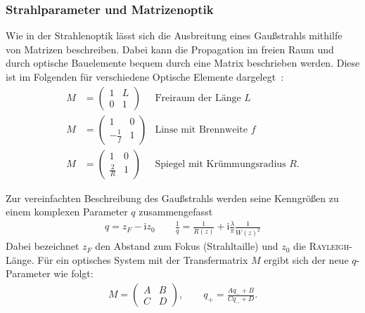 \documentclass[a4paper,twoside,final]{article}
\begin{document}
\subsubsection{Strahlparameter und Matrizenoptik}
Wie in der Strahlenoptik lässt sich die Ausbreitung eines Gaußstrahls mithilfe von Matrizen beschreiben. Dabei kann die Propagation im freien Raum und durch optische Bauelemente bequem durch eine Matrix beschrieben werden. Diese ist im Folgenden für verschiedene Optische Elemente dargelegt~\cite{Peschel}:
\begin{align}
  M &= \begin{pmatrix}
    1 & L \\ 0 & 1
\end{pmatrix} & \text{Freiraum der Länge }L\\
  M &= \begin{pmatrix}
  1 & 0 \\ -\frac{1}{f} & 1
\end{pmatrix} & \text{Linse mit Brennweite }f\\
  M &= \begin{pmatrix}
  1 & 0 \\ \frac{2}{R} & 1
\end{pmatrix} & \text{Spiegel mit Krümmungsradius }R.
\end{align}

Zur vereinfachten Beschreibung des Gaußstrahls werden seine Kenngrößen zu einem komplexen Parameter $q$ zusammengefasst
\begin{align}
  q = z_F - \mathrm{i} z_0 \qquad \frac{1}{q} = \frac{1}{R(z)} + \mathrm{i}\frac{\lambda}{\pi}\frac{1}{W(z)^2}
\end{align}
Dabei bezeichnet $z_F$ den Abstand zum Fokus (Strahltaille) und $z_0$ die \textsc{Rayleigh}-Länge. Für ein optisches System mit der Transfermatrix $M$ ergibt sich der neue $q$-Parameter wie folgt:
\begin{align}\label{eqn:Transfermatrix}
  M = \begin{pmatrix}
    A & B \\ C & D
\end{pmatrix}, \qquad q_+ = \frac{A q_- + B}{C q_- + D}.
\end{align}
\end{document}
